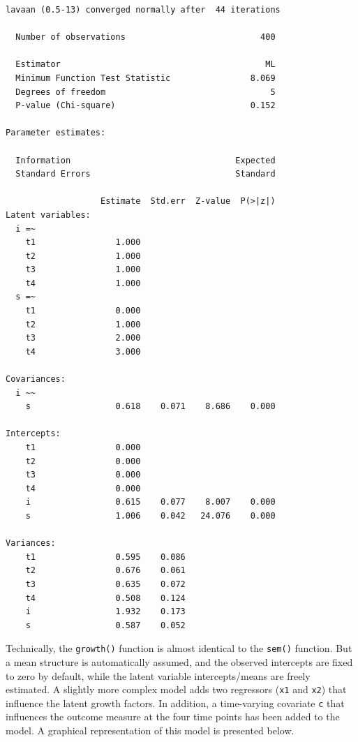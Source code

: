 \begin{verbatim}
lavaan (0.5-13) converged normally after  44 iterations

  Number of observations                           400

  Estimator                                         ML
  Minimum Function Test Statistic                8.069
  Degrees of freedom                                 5
  P-value (Chi-square)                           0.152

Parameter estimates:

  Information                                 Expected
  Standard Errors                             Standard

                   Estimate  Std.err  Z-value  P(>|z|)
Latent variables:
  i =~
    t1                1.000
    t2                1.000
    t3                1.000
    t4                1.000
  s =~
    t1                0.000
    t2                1.000
    t3                2.000
    t4                3.000

Covariances:
  i ~~
    s                 0.618    0.071    8.686    0.000

Intercepts:
    t1                0.000
    t2                0.000
    t3                0.000
    t4                0.000
    i                 0.615    0.077    8.007    0.000
    s                 1.006    0.042   24.076    0.000

Variances:
    t1                0.595    0.086
    t2                0.676    0.061
    t3                0.635    0.072
    t4                0.508    0.124
    i                 1.932    0.173
    s                 0.587    0.052
\end{verbatim}

Technically, the \texttt{growth()} function is almost identical to the
\texttt{sem()} function. But a mean structure is automatically assumed,
and the observed intercepts are fixed to zero by default, while the
latent variable intercepts/means are freely estimated. A slightly more
complex model adds two regressors (\texttt{x1} and \texttt{x2}) that
influence the latent growth factors. In addition, a time-varying
covariate \texttt{c} that influences the outcome measure at the four
time points has been added to the model. A graphical representation of
this model is presented below.

